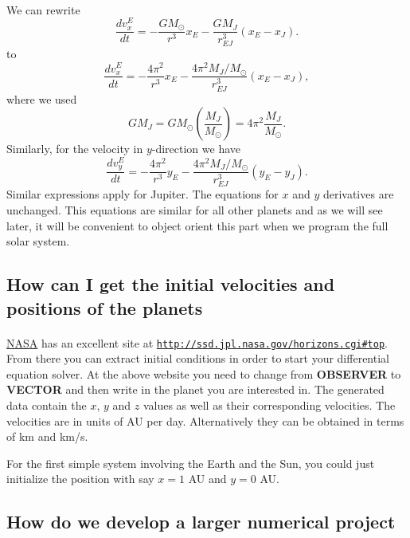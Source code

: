 \documentclass[%
oneside,                 %
final,                   %
10pt]{article}
\begin{document}
\paragraph{}
We can rewrite 
\[
   \frac{dv_x^E}{dt}=-\frac{GM_{\odot}}{r^3}x_E-\frac{GM_J}{r_{EJ}^3}(x_E-x_J).
\]
to
\[
   \frac{dv_x^E}{dt}=-\frac{4\pi^2}{r^3}x_E-\frac{4\pi^2M_J/M_{\odot}}{r_{EJ}^3}(x_E-x_J),
\]
where we used 
\[
GM_J = GM_{\odot}\left(\frac{M_J}{M_{\odot}}\right)=4\pi^2 \frac{M_J}{M_{\odot}}.
\]
Similarly, for the velocity in $y$-direction we have 
\[
   \frac{dv_y^E}{dt}=-\frac{4\pi^2}{r^3}y_E-\frac{4\pi^2M_J/M_{\odot}}{r_{EJ}^3}(y_E-y_J).
\]
Similar expressions apply for Jupiter. The equations for $x$ and $y$ 
derivatives are unchanged. This equations are similar for all other planets and as we will see later, it will be convenient to object orient this part when we program the full solar system.




\subsection*{How can I get the initial velocities and positions of the planets}

\paragraph{}
\href{{http://www.nasa.gov/index.html}}{NASA} has an excellent site at \href{{http://ssd.jpl.nasa.gov/horizons.cgi#top}}{\nolinkurl{http://ssd.jpl.nasa.gov/horizons.cgi\#top}}.
From there you can extract initial conditions in order to start your differential equation solver.
At the above website you need to change from \textbf{OBSERVER} to \textbf{VECTOR} and then write in the planet you are interested in.
The generated data contain the $x$, $y$ and $z$ values as well as their corresponding velocities. The velocities are in units of AU per day.
Alternatively they can be obtained in terms of km and km/s. 

For the first simple system involving the Earth and the Sun, you could just initialize the position with say $x=1$ AU
and $y=0$ AU.



\subsection*{How do we develop a larger numerical project}
\end{document}
